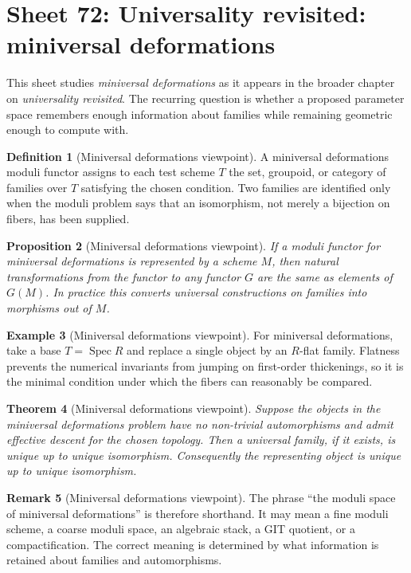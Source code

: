 \documentclass[11pt]{amsart}
\newtheorem{theorem}{Theorem}[section]
\newtheorem{proposition}[theorem]{Proposition}
\theoremstyle{definition}
\newtheorem{definition}[theorem]{Definition}
\newtheorem{example}[theorem]{Example}
\newtheorem{remark}[theorem]{Remark}
\newcommand{\Spec}{\operatorname{Spec}}
\begin{document}
\section{Sheet 72: Universality revisited: miniversal deformations}
This sheet studies \emph{miniversal deformations} as it appears in the broader chapter on \emph{universality revisited}.  The recurring question is whether a proposed parameter space remembers enough information about families while remaining geometric enough to compute with.
\begin{definition}[Miniversal deformations viewpoint]
A miniversal deformations moduli functor assigns to each test scheme $T$ the set, groupoid, or category of families over $T$ satisfying the chosen condition.  Two families are identified only when the moduli problem says that an isomorphism, not merely a bijection on fibers, has been supplied.
\end{definition}
\begin{proposition}[Miniversal deformations viewpoint]
If a moduli functor for miniversal deformations is represented by a scheme $M$, then natural transformations from the functor to any functor $G$ are the same as elements of $G(M)$.  In practice this converts universal constructions on families into morphisms out of $M$.
\end{proposition}
\begin{example}[Miniversal deformations viewpoint]
For miniversal deformations, take a base $T=\Spec R$ and replace a single object by an $R$-flat family.  Flatness prevents the numerical invariants from jumping on first-order thickenings, so it is the minimal condition under which the fibers can reasonably be compared.
\end{example}
\begin{theorem}[Miniversal deformations viewpoint]
Suppose the objects in the miniversal deformations problem have no non-trivial automorphisms and admit effective descent for the chosen topology.  Then a universal family, if it exists, is unique up to unique isomorphism.  Consequently the representing object is unique up to unique isomorphism.
\end{theorem}
\begin{remark}[Miniversal deformations viewpoint]
The phrase ``the moduli space of miniversal deformations'' is therefore shorthand.  It may mean a fine moduli scheme, a coarse moduli space, an algebraic stack, a GIT quotient, or a compactification.  The correct meaning is determined by what information is retained about families and automorphisms.
\end{remark}
\end{document}
